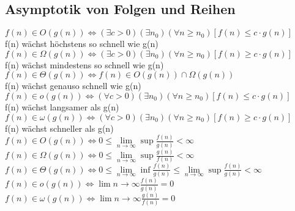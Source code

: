 \documentclass[a4paper]{scrartcl}
\begin{document}
\subsection{Asymptotik von Folgen und Reihen}
$f(n) \in O(g(n)) \Leftrightarrow (\exists c > 0)(\exists n_0)(\forall n \geq n_0)[f(n)\leq c\cdot g(n)]$\\
f(n) wächst höchstens so schnell wie g(n)\\   
$f(n) \in \Omega(g(n)) \Leftrightarrow (\exists c > 0)(\exists n_0)(\forall n \geq n_0)[f(n)\geq c\cdot g(n)]$\\
f(n) wächst mindestens so schnell wie g(n)\\
$f(n)\in \Theta (g(n)) \Leftrightarrow f(n) \in O(g(n)) \cap \Omega(g(n))$\\
f(n) wächst genauso schnell wie g(n)\\
$f(n) \in o(g(n)) \Leftrightarrow (\forall c > 0)(\exists n_0)(\forall n \geq n_0)[f(n) \leq c\cdot g(n)]$\\
f(n) wächst langsamer als g(n)\\
$f(n) \in \omega(g(n)) \Leftrightarrow (\forall c > 0)(\exists n_0)(\forall n \geq n_0)[f(n)\geq c\cdot g(n)]$\\
f(n) wächst schneller als g(n)\\

$f(n) \in O(g(n)) \Leftrightarrow 0 \leq \lim \limits_{n \to \infty} \sup \frac{f(n)}{g(n)}<\infty$\\
$f(n) \in \Omega (g(n)) \Leftrightarrow 0 \leq \lim \limits_{n \to \infty} \sup \frac{g(n)}{f(n)}<\infty$\\
$f(n) \in \Theta(g(n)) \Leftrightarrow 0 \leq \lim \limits_{n \to \infty} \inf \frac{f(n)}{g(n)} \leq \lim \limits_{n \to \infty} \sup \frac{f(n)}{g(n)}<\infty$\\
$f(n) \in o(g(n)) \Leftrightarrow \lim \limits{n \to \infty} \frac{f(n)}{g(n)}= 0$\\
$f(n) \in \omega(g(n)) \Leftrightarrow \lim \limits{n \to \infty} \frac{g(n)}{f(n)}= 0$\\
\end{document}
